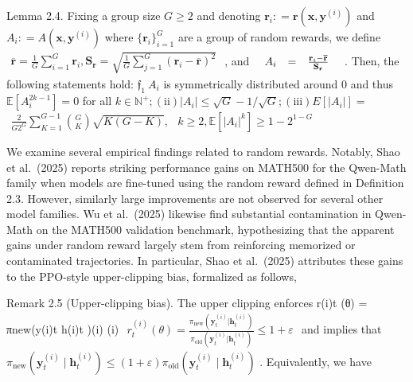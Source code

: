 \documentclass[
  10
]{article}
\begin{document}
Lemma 2.4. Fixing a group size \(G \geq 2\) and denoting
\(\mathbf { r } _ { i } : = \mathbf { r } ( \mathbf { x } , \mathbf { y } ^ { ( i ) } )\)
and \(A _ { i } : = A ( \mathbf { x } , \mathbf { y } ^ { ( i ) } )\)
where \(\{ \mathbf { r } _ { i } \} _ { i = 1 } ^ { G }\) are a group of
random rewards, we define
\(\begin{array} { r } { \overline { { \mathbf { r } } } = \frac { 1 } { G } \sum _ { i = 1 } ^ { G } \mathbf { r } _ { i } , \mathbf { S } _ { \mathbf { r } } = \sqrt { \frac { 1 } { G } \sum _ { j = 1 } ^ { G } ( \mathbf { r } _ { i } - \overline { { \mathbf { r } } } ) ^ { 2 } } } \end{array}\)
, and
\(\begin{array} { r } { \begin{array} { r c l } { A _ { i } } & { = } & { \frac { \mathbf { r } _ { i } - \overline { { \mathbf { r } } } } { \mathbf { S _ { r } } } } \end{array} } \end{array}\)
. Then, the following statements hold:
\({ \mathfrak { f } } _ { 1 } \ A _ { i }\) is symmetrically distributed
around 0 and thus \(\mathbb { E } [ A _ { i } ^ { 2 k - 1 } ] = 0\) for
all
\(k \in \mathbb { N } ^ { + } ; ( \mathrm { i i } ) | A _ { i } | \leq \sqrt { G } - 1 / \sqrt { G } ; ( \mathrm { i i i } ) E [ | A _ { i } | ] =\)
\(\begin{array} { r } { \frac { 2 } { G 2 ^ { G } } \sum _ { K = 1 } ^ { G - 1 } \binom { G } { K } \sqrt { K ( G - K ) } , } \end{array}\)
\(k \geq 2 , \mathbb { E } [ | A _ { i } | ^ { k } ] \geq 1 - 2 ^ { 1 - G }\)

We examine several empirical findings related to random rewards.
Notably, Shao et al.~(2025) reports striking performance gains on
MATH500 for the Qwen-Math family when models are fine-tuned using the
random reward defined in Definition 2.3. However, similarly large
improvements are not observed for several other model families. Wu et
al.~(2025) likewise find substantial contamination in Qwen-Math on the
MATH500 validation benchmark, hypothesizing that the apparent gains
under random reward largely stem from reinforcing memorized or
contaminated trajectories. In particular, Shao et al.~(2025) attributes
these gains to the PPO-style upper-clipping bias, formalized as follows,

Remark 2.5 (Upper-clipping bias). The upper clipping enforces r(i)t (θ)
= πnew(y(i)t \textbar h(i)t )(i) (i)
\(\begin{array} { r } { r _ { t } ^ { ( i ) } ( \theta ) = \frac { \pi _ { \mathrm { n e w } } ( \mathbf { y } _ { t } ^ { ( i ) } | \mathbf { h } _ { t } ^ { ( i ) } ) } { \pi _ { \mathrm { o l d } } ( \mathbf { y } _ { t } ^ { ( i ) } | \mathbf { h } _ { t } ^ { ( i ) } ) } \leq 1 + \varepsilon } \end{array}\)
and implies that
\(\pi _ { \mathrm { n e w } } ( \mathbf { y } _ { t } ^ { ( i ) } \mid \mathbf { h } _ { t } ^ { ( i ) } ) \leq ( 1 + \varepsilon ) \pi _ { \mathrm { o l d } } ( \mathbf { y } _ { t } ^ { ( i ) } \mid \mathbf { h } _ { t } ^ { ( i ) } )\)
. Equivalently, we have
\end{document}
